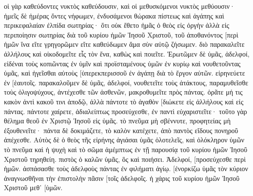οἱ γὰρ καθεύδοντες νυκτὸς καθεύδουσιν, καὶ οἱ μεθυσκόμενοι νυκτὸς μεθύουσιν· 
ἡμεῖς δὲ ἡμέρας ὄντες νήφωμεν, ἐνδυσάμενοι θώρακα πίστεως καὶ ἀγάπης καὶ περικεφαλαίαν ἐλπίδα σωτηρίας· 
ὅτι οὐκ ἔθετο ἡμᾶς ὁ θεὸς εἰς ὀργὴν ἀλλὰ εἰς περιποίησιν σωτηρίας διὰ τοῦ κυρίου ἡμῶν Ἰησοῦ Χριστοῦ, 
τοῦ ἀποθανόντος [περὶ ἡμῶν ἵνα εἴτε γρηγορῶμεν εἴτε καθεύδωμεν ἅμα σὺν αὐτῷ ζήσωμεν. 
διὸ παρακαλεῖτε ἀλλήλους καὶ οἰκοδομεῖτε εἷς τὸν ἕνα, καθὼς καὶ ποιεῖτε. 
Ἐρωτῶμεν δὲ ὑμᾶς, ἀδελφοί, εἰδέναι τοὺς κοπιῶντας ἐν ὑμῖν καὶ προϊσταμένους ὑμῶν ἐν κυρίῳ καὶ νουθετοῦντας ὑμᾶς, 
καὶ ἡγεῖσθαι αὐτοὺς [ὑπερεκπερισσοῦ ἐν ἀγάπῃ διὰ τὸ ἔργον αὐτῶν. εἰρηνεύετε ἐν [ἑαυτοῖς. 
παρακαλοῦμεν δὲ ὑμᾶς, ἀδελφοί, νουθετεῖτε τοὺς ἀτάκτους, παραμυθεῖσθε τοὺς ὀλιγοψύχους, ἀντέχεσθε τῶν ἀσθενῶν, μακροθυμεῖτε πρὸς πάντας. 
ὁρᾶτε μή τις κακὸν ἀντὶ κακοῦ τινι ἀποδῷ, ἀλλὰ πάντοτε τὸ ἀγαθὸν [διώκετε εἰς ἀλλήλους καὶ εἰς πάντας. 
πάντοτε χαίρετε, 
ἀδιαλείπτως προσεύχεσθε, 
ἐν παντὶ εὐχαριστεῖτε· τοῦτο γὰρ θέλημα θεοῦ ἐν Χριστῷ Ἰησοῦ εἰς ὑμᾶς. 
τὸ πνεῦμα μὴ σβέννυτε, 
προφητείας μὴ ἐξουθενεῖτε· 
πάντα δὲ δοκιμάζετε, τὸ καλὸν κατέχετε, 
ἀπὸ παντὸς εἴδους πονηροῦ ἀπέχεσθε. 
Αὐτὸς δὲ ὁ θεὸς τῆς εἰρήνης ἁγιάσαι ὑμᾶς ὁλοτελεῖς, καὶ ὁλόκληρον ὑμῶν τὸ πνεῦμα καὶ ἡ ψυχὴ καὶ τὸ σῶμα ἀμέμπτως ἐν τῇ παρουσίᾳ τοῦ κυρίου ἡμῶν Ἰησοῦ Χριστοῦ τηρηθείη. 
πιστὸς ὁ καλῶν ὑμᾶς, ὃς καὶ ποιήσει. 
Ἀδελφοί, [προσεύχεσθε περὶ ἡμῶν. 
ἀσπάσασθε τοὺς ἀδελφοὺς πάντας ἐν φιλήματι ἁγίῳ. 
[ἐνορκίζω ὑμᾶς τὸν κύριον ἀναγνωσθῆναι τὴν ἐπιστολὴν πᾶσιν [τοῖς ἀδελφοῖς. 
ἡ χάρις τοῦ κυρίου ἡμῶν Ἰησοῦ Χριστοῦ μεθ᾽ [ὑμῶν. 
